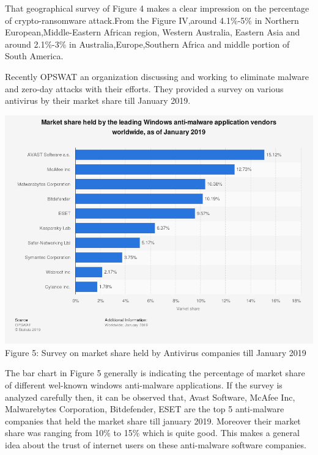 \documentclass[conference,double column]{IEEEtran}
\begin{document}
	That geographical survey of Figure 4 makes a clear impression on the percentage of crypto-ransomware attack.From the Figure IV,around 4.1\%-5\% in Northern European,Middle-Eastern African region, Western Australia, Eastern Asia and around 2.1\%-3\% in Australia,Europe,Southern Africa and middle portion of South America.  
	
	
	Recently OPSWAT an organization discussing and working to eliminate malware and zero-day attacks with their efforts. They provided a survey on various antivirus by their market share till January 2019. 
	
	
		\begin{center}
			\includegraphics[scale=0.22]{antivsurvey.png}\\
			{\footnotesize Figure 5: Survey on market share held by Antivirus companies till January 2019~\cite{r14}}
		\end{center}
		
	The bar chart in Figure 5 generally is indicating the percentage of market share of different wel-known windows anti-malware applications. If the survey is analyzed carefully then, it can be observed that, Avast Software, McAfee Inc, Malwarebytes Corporation, Bitdefender, ESET are the top 5 anti-malware companies that held the market share till january 2019. Moreover their market share was ranging from 10\% to 15\% which is quite good. This makes a general idea about the trust of internet users on these anti-malware software companies.\\
	
\end{document}
